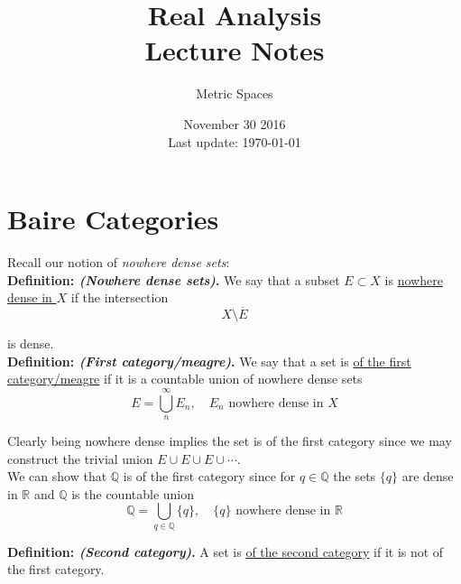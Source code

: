 \documentclass[12pt]{article}
\newlength\tindent
\renewcommand{\indent}{\hspace*{\tindent}}
\newcommand{\R}{\mathbb R}
\newcommand{\Q}{\mathbb Q}
\begin{document}
 
 
\title{Real Analysis\\Lecture Notes}
\author{Metric Spaces}
\date{November 30 2016 \\ Last update: \today{}}
\maketitle

\section{Baire Categories}

Recall our notion of {\em nowhere dense sets}: \\

%
%
{\bf Definition: {\em (Nowhere dense sets)}.} We say that a subset $E \subset X$ is \underline{nowhere dense in $X$} if the intersection
\begin{equation*}
	X\setminus\overline{E}
\end{equation*}

is dense. \\

%
%
{\bf Definition: {\em (First category/meagre)}.} We say that a set is \underline{of the first category/meagre} if it is a countable union of nowhere dense sets
\begin{equation*}
	E = \bigcup^\infty_{n} E_n, \quad E_n \text{ nowhere dense in $X$}
\end{equation*}

\indent Clearly being nowhere dense implies the set is of the first category since we may construct the trivial union $E \cup E \cup E \cup \cdots$. \\

\indent We can show that $\Q$ is of the first category since for $q \in \Q$ the sets $\{q\}$ are dense in $\R$ and $\Q$ is the countable union
\begin{equation*}
	\Q = \bigcup_{q\in\Q} \{q\}, \quad \{q\} \text{ nowhere dense in $\R$}
\end{equation*}

%
%
{\bf Definition: {\em (Second category)}.} A set is \underline{of the second category} if it is not of the first category. \\
\end{document}

